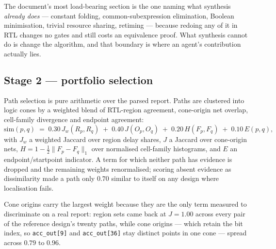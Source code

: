 \documentclass[11pt,a4paper]{article}
\begin{document}
The document's most load-bearing section is the one naming what synthesis
\emph{already does} --- constant folding, common-subexpression elimination,
Boolean minimisation, trivial resource sharing, retiming --- because redoing
any of it in RTL changes no gates and still costs an equivalence proof. What
synthesis cannot do is change the algorithm, and that boundary is where an
agent's contribution actually lies.

\subsection{Stage 2 --- portfolio selection}

Path selection is pure arithmetic over the parsed report. Paths are clustered
into logic cones by a weighted blend of RTL-region agreement, cone-origin net
overlap, cell-family divergence and endpoint agreement:
%
\begin{equation}
\mathrm{sim}(p,q) \;=\;
  0.30\, J_w(R_p,R_q) \;+\;
  0.40\, J(O_p,O_q)   \;+\;
  0.20\, H(F_p,F_q)   \;+\;
  0.10\, E(p,q),
\end{equation}
%
with $J_w$ a weighted Jaccard over region delay shares, $J$ a Jaccard over
cone-origin nets, $H = 1 - \tfrac12\|F_p-F_q\|_1$ over normalised cell-family
histograms, and $E$ an endpoint/startpoint indicator. A term for which neither
path has evidence is dropped and the remaining weights renormalised; scoring
absent evidence as dissimilarity made a path only $0.70$ similar to itself on
any design where localisation fails.

Cone origins carry the largest weight because they are the only term measured
to discriminate on a real report: region sets came back at $J=1.00$ across
every pair of the reference design's twenty paths, while cone origins --- which
retain the bit index, so \texttt{acc\_out[9]} and \texttt{acc\_out[36]} stay
distinct points in one cone --- spread across $0.79$ to $0.96$.
\end{document}
